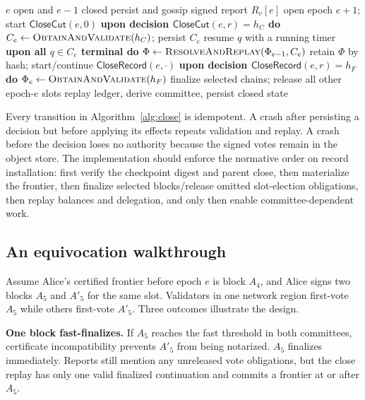 \documentclass[sigplan,review,anonymous]{acmart}
\newcommand{\Cut}{\mathsf{CloseCut}}
\newcommand{\Record}{\mathsf{CloseRecord}}
\newcommand{\frontier}{\Phi}
\newcommand{\paragraphhead}[1]{\smallskip\noindent\textbf{#1}}
\begin{document}
\begin{algorithm}[t]
\caption{Condensed close controller at validator $v$}
\label{alg:close}
\small
\begin{algorithmic}[1]
  \Require $e$ open and $e-1$ closed
  \State persist and gossip signed report $R_v[e]$
  \State open epoch $e+1$; start $\Cut(e,0)$
\EndProcedure
\Statex \textbf{upon decision $\Cut(e,r)=h_C$ do}
  \State $C_e\gets\Call{ObtainAndValidate}{h_C}$; persist $C_e$
   \State resume $q$ with a running timer \EndFor
\Statex \textbf{upon all $q\in C_e$ terminal do}
  \State $\frontier\gets\Call{ResolveAndReplay}{\frontier_{e-1},C_e}$
  \State retain $\frontier$ by hash; start/continue $\Record(e,\cdot)$
\Statex \textbf{upon decision $\Record(e,r)=h_F$ do}
  \State $\frontier_e\gets\Call{ObtainAndValidate}{h_F}$
  \State finalize selected chains; release all other epoch-$e$ slots
  \State replay ledger, derive committee, persist closed state
\end{algorithmic}
\end{algorithm}

Every transition in Algorithm~\ref{alg:close} is idempotent.  A crash after persisting a decision but before applying its effects repeats validation and replay.  A crash before the decision loses no authority because the signed votes remain in the object store.  The implementation should enforce the normative order on record installation: first verify the checkpoint digest and parent close, then materialize the frontier, then finalize selected blocks/release omitted slot-election obligations, then replay balances and delegation, and only then enable committee-dependent work.

\subsection{An equivocation walkthrough}

Assume Alice's certified frontier before epoch $e$ is block $A_4$, and Alice signs two blocks $A_5$ and $A'_5$ for the same slot.  Validators in one network region first-vote $A_5$ while others first-vote $A'_5$.  Three outcomes illustrate the design.

\paragraphhead{One block fast-finalizes.}
If $A_5$ reaches the fast threshold in both committees, certificate incompatibility prevents $A'_5$ from being notarized.  $A_5$ finalizes immediately.  Reports still mention any unreleased vote obligations, but the close replay has only one valid finalized continuation and commits a frontier at or after $A_5$.
\end{document}
